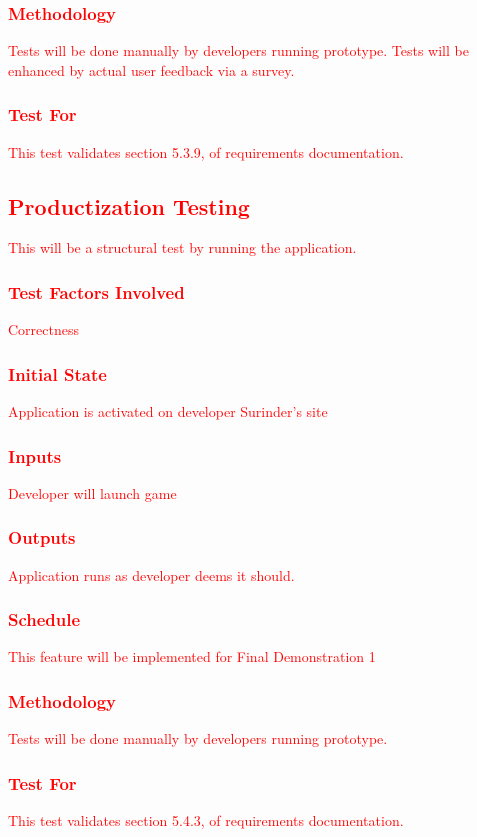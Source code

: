 \documentclass[11pt, oneside]{article}   	%
\begin{document}
\subsubsection{\textcolor{red}{Methodology}}
\textcolor{red}{Tests will be done manually by developers running prototype. Tests will be enhanced by actual user feedback via a survey.}
\subsubsection{\textcolor{red}{Test For}}
\textcolor{red}{This test validates section 5.3.9, of requirements documentation.}


\subsection{\textcolor{red}{Productization Testing}}
\textcolor{red}{This will be a structural test by running the application.}
\subsubsection{\textcolor{red}{Test Factors Involved}}
\textcolor{red}{Correctness}
\subsubsection{\textcolor{red}{Initial State}}
\textcolor{red}{Application is activated on developer Surinder's site}
\subsubsection{\textcolor{red}{Inputs}}
\textcolor{red}{Developer will launch game}
\subsubsection{\textcolor{red}{Outputs}}
\textcolor{red}{Application runs as developer deems it should.}
\subsubsection{\textcolor{red}{Schedule}}
\textcolor{red}{This feature will be implemented for Final Demonstration 1}
\subsubsection{\textcolor{red}{Methodology}}
\textcolor{red}{Tests will be done manually by developers running prototype.}
\subsubsection{\textcolor{red}{Test For}}
\textcolor{red}{This test validates section 5.4.3, of requirements documentation.}
\end{document}
